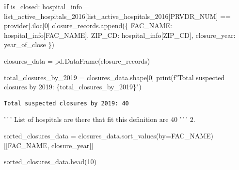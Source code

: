 \documentclass[
  letterpaper,
  DIV=11,
  numbers=noendperiod]{scrartcl}
\newenvironment{Shaded}{\begin{snugshade}}{\end{snugshade}}
\newcommand{\BuiltInTok}[1]{\textcolor[rgb]{0.00,0.23,0.31}{#1}}
\newcommand{\ControlFlowTok}[1]{\textcolor[rgb]{0.00,0.23,0.31}{\textbf{#1}}}
\newcommand{\DecValTok}[1]{\textcolor[rgb]{0.68,0.00,0.00}{#1}}
\newcommand{\NormalTok}[1]{\textcolor[rgb]{0.00,0.23,0.31}{#1}}
\newcommand{\OperatorTok}[1]{\textcolor[rgb]{0.37,0.37,0.37}{#1}}
\newcommand{\SpecialCharTok}[1]{\textcolor[rgb]{0.37,0.37,0.37}{#1}}
\newcommand{\SpecialStringTok}[1]{\textcolor[rgb]{0.13,0.47,0.30}{#1}}
\newcommand{\StringTok}[1]{\textcolor[rgb]{0.13,0.47,0.30}{#1}}
\begin{document}
\begin{Shaded}
\begin{Highlighting}[]
    \ControlFlowTok{if}\NormalTok{ is\_closed:}
\NormalTok{        hospital\_info }\OperatorTok{=}\NormalTok{ list\_active\_hospitals\_2016[list\_active\_hospitals\_2016[}\StringTok{\textquotesingle{}PRVDR\_NUM\textquotesingle{}}\NormalTok{] }\OperatorTok{==}\NormalTok{ provider].iloc[}\DecValTok{0}\NormalTok{]}
\NormalTok{        closure\_records.append(\{}
            \StringTok{\textquotesingle{}FAC\_NAME\textquotesingle{}}\NormalTok{: hospital\_info[}\StringTok{\textquotesingle{}FAC\_NAME\textquotesingle{}}\NormalTok{],}
            \StringTok{\textquotesingle{}ZIP\_CD\textquotesingle{}}\NormalTok{: hospital\_info[}\StringTok{\textquotesingle{}ZIP\_CD\textquotesingle{}}\NormalTok{],}
            \StringTok{\textquotesingle{}closure\_year\textquotesingle{}}\NormalTok{: year\_of\_close}
\NormalTok{        \})}

\NormalTok{closures\_data }\OperatorTok{=}\NormalTok{ pd.DataFrame(closure\_records)}

\NormalTok{total\_closures\_by\_2019 }\OperatorTok{=}\NormalTok{ closures\_data.shape[}\DecValTok{0}\NormalTok{]}
\BuiltInTok{print}\NormalTok{(}\SpecialStringTok{f"Total suspected closures by 2019: }\SpecialCharTok{\{}\NormalTok{total\_closures\_by\_2019}\SpecialCharTok{\}}\SpecialStringTok{"}\NormalTok{)}
\end{Highlighting}
\end{Shaded}

\begin{verbatim}
Total suspected closures by 2019: 40
\end{verbatim}

'\,'\,' List of hospitals are there that fit this definition are 40
'\,'\,' 2.

\begin{Shaded}
\begin{Highlighting}[]
\NormalTok{sorted\_closures\_data }\OperatorTok{=}\NormalTok{ closures\_data.sort\_values(by}\OperatorTok{=}\StringTok{\textquotesingle{}FAC\_NAME\textquotesingle{}}\NormalTok{)[[}\StringTok{\textquotesingle{}FAC\_NAME\textquotesingle{}}\NormalTok{, }\StringTok{\textquotesingle{}closure\_year\textquotesingle{}}\NormalTok{]]}

\NormalTok{sorted\_closures\_data.head(}\DecValTok{10}\NormalTok{)}
\end{Highlighting}
\end{Shaded}
\end{document}
